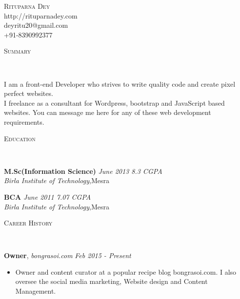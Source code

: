 \documentclass[9pt]{article}
\newenvironment{changemargin}[2]{%
  \begin{list}{}{%
    \setlength{\topsep}{0pt}%
    \setlength{\leftmargin}{#1}%
    \setlength{\rightmargin}{#2}%
    \setlength{\listparindent}{\parindent}%
    \setlength{\itemindent}{\parindent}%
    \setlength{\parsep}{\parskip}%
  }%
  \item[]}{\end{list}
}
\newcommand{\lineover}{
	\begin{changemargin}{-0.05in}{-0.05in}
		\vspace*{-8pt}
		\hrulefill \\
		\vspace*{-2pt}
	\end{changemargin}
}
\newcommand{\header}[1]{
	\begin{changemargin}{-0.5in}{-0.5in}
		\scshape{#1}\\
  	\lineover
	\end{changemargin}
}
\newcommand{\contact}[4]{
	\begin{changemargin}{-0.5in}{-0.5in}
		\begin{center}
			{\Large \scshape {#1}}\\ \smallskip
			{#2}\\ \smallskip 
			{#3}\\ \smallskip
			{#4}\smallskip
		\end{center}
	\end{changemargin}
}
\newenvironment{body} {
	\vspace*{-16pt}
	\begin{changemargin}{-0.25in}{-0.5in}
  }	
	{\end{changemargin}
}
\begin{document}
\contact{Rituparna Dey}{http://rituparnadey.com}{deyritu20@gmail.com}{+91-8390992377}


\header{Summary}

\begin{body}
	\vspace{14pt}
I am a front-end Developer who strives to write quality code and create pixel perfect websites.\\
I freelance as a consultant for Wordpress, bootstrap and JavaScript based websites. You can message me here for any of these web development requirements.\\

\end{body}

\smallskip


\header{Education}

\begin{body}
	\vspace{14pt}
	\textbf{M.Sc(Information Science)}{} \hfill \emph{June 2013 8.3 CGPA}{} \\
	\emph{Birla Institute of Technology},Mesra{} \\
\end{body}

\begin{body}
	\vspace{14pt}
	\textbf{BCA }{} \hfill \emph{June 2011 7.07 CGPA}{} \\
	\emph{Birla Institute of Technology},Mesra{} \\
\end{body}

\smallskip


\header{Career History}

\begin{body}
	\vspace{14pt}
	\textbf{Owner}, \emph{bongrasoi.com} \hfill \emph{Feb 2015 - Present}\\
	\begin{itemize}
		\item Owner and content curator at a popular recipe blog bongrasoi.com. I also oversee the social media marketing, Website design and Content Management.\\
	\end{itemize}
	\vspace*{-4pt}
\end{body}
\end{document}
